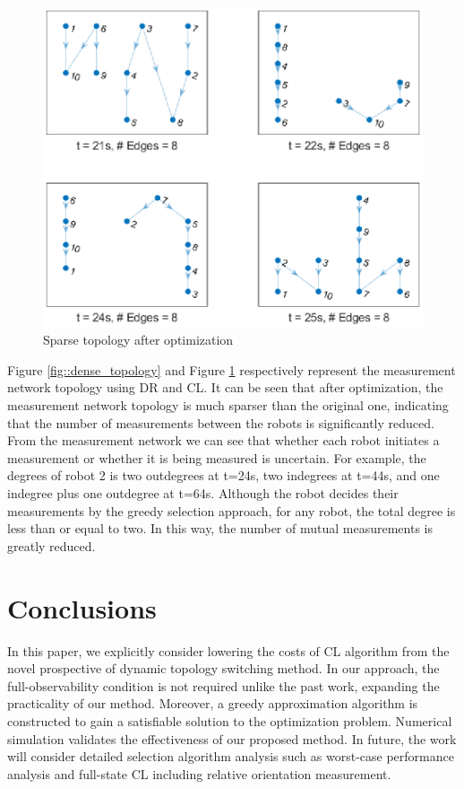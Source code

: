 \documentclass[conference]{IEEEtran}
\begin{document}
\begin{figure}[H]
	\centering
	\includegraphics[width=3.5 in]{Fig/topology_sparse.eps}
	\caption{Sparse topology after optimization}
	\label{fig::sparse_topology}
\end{figure}
Figure \ref{fig::dense_topology} and Figure \ref{fig::sparse_topology} respectively represent the measurement network topology using DR and CL.
It can be seen that after optimization, the measurement network topology is much sparser than the original one, indicating that the number of measurements between the robots is significantly reduced. From the measurement network we can see that whether each robot initiates a measurement or whether it is being measured is uncertain. For example, the degrees of robot 2 is two outdegrees at t=24s, two indegrees at t=44s, and one indegree plus one outdegree at t=64s. Although the robot decides their measurements by the greedy selection approach, for any robot, the total degree is less than or equal to two. In this way, the number of mutual measurements is greatly reduced.

\section{Conclusions}
In this paper, we explicitly consider lowering the costs of CL algorithm from the novel prospective of dynamic topology switching method.
In our approach, the full-observability condition is not required unlike the past work, expanding the practicality of our method.
Moreover, a greedy approximation algorithm is constructed to gain a satisfiable solution to the optimization problem.
Numerical simulation validates the effectiveness of our proposed method.
In future, the work will consider detailed selection algorithm analysis such as worst-case performance analysis and full-state CL including relative orientation measurement.



\end{document}
